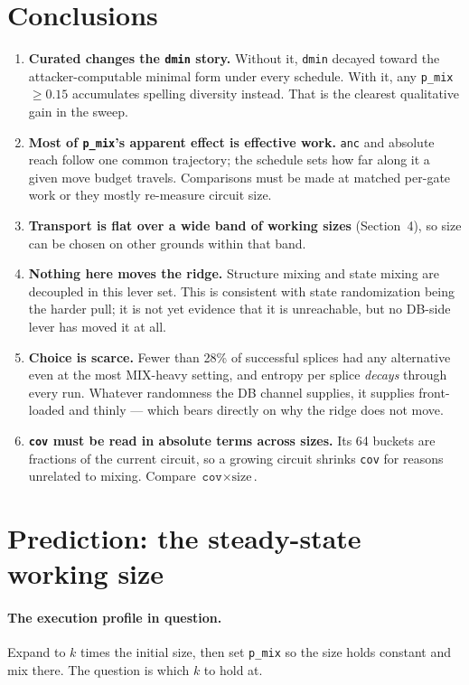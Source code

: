 \documentclass[11pt]{article}
\begin{document}
\section{Conclusions}

\begin{enumerate}
\item \textbf{Curated changes the \texttt{dmin} story.} Without it, \texttt{dmin}
      decayed toward the attacker-computable minimal form under every schedule.
      With it, any \texttt{p\_mix} $\ge 0.15$ accumulates spelling diversity
      instead. That is the clearest qualitative gain in the sweep.
\item \textbf{Most of \texttt{p\_mix}'s apparent effect is effective work.}
      \texttt{anc} and absolute reach follow one common trajectory; the schedule
      sets how far along it a given move budget travels. Comparisons must be made
      at matched per-gate work or they mostly re-measure circuit size.
\item \textbf{Transport is flat over a wide band of working sizes} (Section~4),
      so size can be chosen on other grounds within that band.
\item \textbf{Nothing here moves the ridge.} Structure mixing and state mixing
      are decoupled in this lever set. This is consistent with state
      randomization being the harder pull; it is not yet evidence that it is
      unreachable, but no DB-side lever has moved it at all.
\item \textbf{Choice is scarce.} Fewer than 28\% of successful splices had any
      alternative even at the most MIX-heavy setting, and entropy per splice
      \emph{decays} through every run. Whatever randomness the DB channel
      supplies, it supplies front-loaded and thinly --- which bears directly on
      why the ridge does not move.
\item \textbf{\texttt{cov} must be read in absolute terms across sizes.} Its 64
      buckets are fractions of the current circuit, so a growing circuit shrinks
      \texttt{cov} for reasons unrelated to mixing. Compare
      $\texttt{cov} \times \text{size}$.
\end{enumerate}

\section{Prediction: the steady-state working size}

\paragraph{The execution profile in question.} Expand to $k$ times the initial
size, then set \texttt{p\_mix} so the size holds constant and mix there. The
question is which $k$ to hold at.
\end{document}
